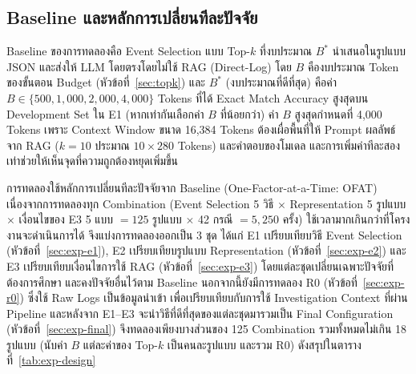 \subsection{Baseline และหลักการเปลี่ยนทีละปัจจัย}
\label{sec:baseline-ofat}
Baseline ของการทดลองคือ Event Selection แบบ Top-$k$ ที่งบประมาณ $B^{*}$
นำเสนอในรูปแบบ JSON และส่งให้ LLM โดยตรงโดยไม่ใช้ RAG (Direct-Log)
โดย $B$ คืองบประมาณ Token ของขั้นตอน Budget (หัวข้อที่~\ref{sec:topk})
และ $B^{*}$ (งบประมาณที่ดีที่สุด) คือค่า $B \in \{500, 1{,}000, 2{,}000, 4{,}000\}$ Tokens ที่ได้ Exact Match Accuracy สูงสุดบน Development Set ใน E1 (หากเท่ากันเลือกค่า $B$ ที่น้อยกว่า)
ค่า $B$ สูงสุดกำหนดที่ 4,000 Tokens เพราะ Context Window ขนาด 16,384 Tokens
ต้องเผื่อพื้นที่ให้ Prompt ผลลัพธ์จาก RAG ($k=10$ ประมาณ $10 \times 280$ Tokens) และคำตอบของโมเดล
และการเพิ่มค่าทีละสองเท่าช่วยให้เห็นจุดที่ความถูกต้องหยุดเพิ่มขึ้น

การทดลองใช้หลักการเปลี่ยนทีละปัจจัยจาก Baseline (One-Factor-at-a-Time: OFAT)
เนื่องจากการทดลองทุก Combination (Event Selection 5 วิธี $\times$ Representation 5 รูปแบบ $\times$ เงื่อนไขของ E3 5 แบบ $= 125$ รูปแบบ $\times$ 42 กรณี $= 5{,}250$ ครั้ง)
ใช้เวลามากเกินกว่าที่โครงงานจะดำเนินการได้
จึงแบ่งการทดลองออกเป็น 3 ชุด ได้แก่ E1 เปรียบเทียบวิธี Event Selection (หัวข้อที่~\ref{sec:exp-e1}),
E2 เปรียบเทียบรูปแบบ Representation (หัวข้อที่~\ref{sec:exp-e2})
และ E3 เปรียบเทียบเงื่อนไขการใช้ RAG (หัวข้อที่~\ref{sec:exp-e3})
โดยแต่ละชุดเปลี่ยนเฉพาะปัจจัยที่ต้องการศึกษา และคงปัจจัยอื่นไว้ตาม Baseline
นอกจากนี้ยังมีการทดลอง R0 (หัวข้อที่~\ref{sec:exp-r0}) ซึ่งใช้ Raw Logs เป็นข้อมูลนำเข้า
เพื่อเปรียบเทียบกับการใช้ Investigation Context ที่ผ่าน Pipeline
และหลังจาก E1--E3 จะนำวิธีที่ดีที่สุดของแต่ละชุดมารวมเป็น Final Configuration (หัวข้อที่~\ref{sec:exp-final})
จึงทดลองเพียงบางส่วนของ 125 Combination รวมทั้งหมดไม่เกิน 18 รูปแบบ
(นับค่า $B$ แต่ละค่าของ Top-$k$ เป็นคนละรูปแบบ และรวม R0) ดังสรุปในตารางที่~\ref{tab:exp-design}

